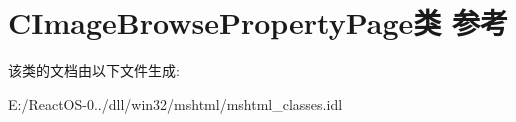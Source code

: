 \hypertarget{class_c_image_browse_property_page}{}\section{C\+Image\+Browse\+Property\+Page类 参考}
\label{class_c_image_browse_property_page}


该类的文档由以下文件生成\+:\begin{DoxyCompactItemize}
\item 
E\+:/\+React\+O\+S-\/0../dll/win32/mshtml/mshtml\+\_\+classes.\+idl\end{DoxyCompactItemize}
